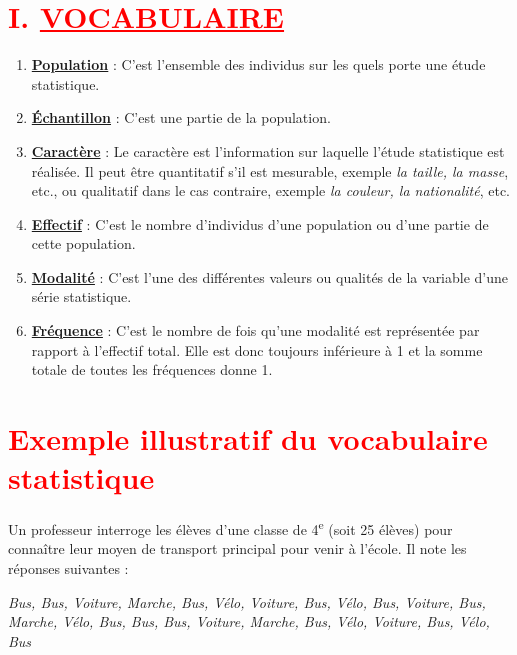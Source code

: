 \documentclass[12pt,a4paper]{article}
\begin{document}
\begin{center}
\end{center}

\section*{\textcolor{red}{I. \underline{VOCABULAIRE}}}

\begin{enumerate}
    \item \textbf{\underline{Population}} : C’est l’ensemble des individus sur les quels porte une étude statistique.
    \item \textbf{\underline{Échantillon}} : C’est une partie de la population.
    \item \textbf{\underline{Caractère}} : Le caractère est l’information sur laquelle l’étude statistique est réalisée. Il peut être quantitatif s’il est mesurable, exemple \textit{la taille, la masse}, etc., ou qualitatif dans le cas contraire, exemple \textit{la couleur, la nationalité}, etc.
    \item \textbf{\underline{Effectif}} : C’est le nombre d’individus d’une population ou d’une partie de cette population.
    \item \textbf{\underline{Modalité}} : C’est l’une des différentes valeurs ou qualités de la variable d’une série statistique.
    \item \textbf{\underline{Fréquence}} : C’est le nombre de fois qu’une modalité est représentée par rapport à l’effectif total. Elle est donc toujours inférieure à 1 et la somme totale de toutes les fréquences donne 1.
\end{enumerate}

\section*{\textcolor{red}{Exemple illustratif du vocabulaire statistique}}

\begin{tcolorbox}[colback=gray!5, colframe=black, title=\textbf{Situation}]
Un professeur interroge les élèves d’une classe de 4\textsuperscript{e} (soit 25 élèves) pour connaître leur moyen de transport principal pour venir à l’école. Il note les réponses suivantes :
\begin{center}
\textit{Bus, Bus, Voiture, Marche, Bus, Vélo, Voiture, Bus, Vélo, Bus, Voiture, Bus, Marche, Vélo, Bus, Bus, Bus, Voiture, Marche, Bus, Vélo, Voiture, Bus, Vélo, Bus}
\end{center}
\end{tcolorbox}
\end{document}
